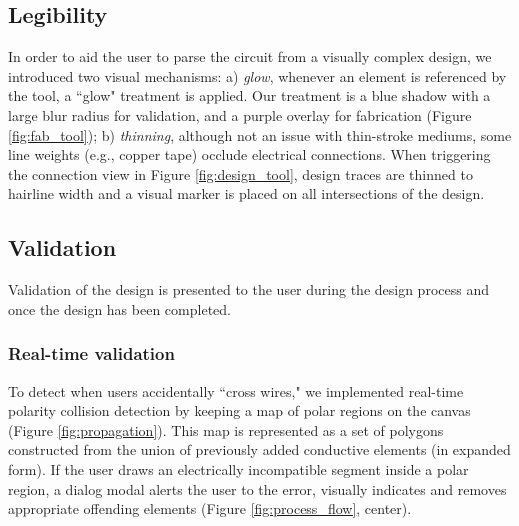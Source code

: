 \documentclass{sigchi}
\begin{document}
    \subsection{Legibility}
        In order to aid the user to parse the circuit from a visually complex design, we introduced two visual mechanisms: a) \textit{glow}, whenever an element is referenced by the tool, a ``glow" treatment is applied. Our treatment is a blue shadow with a large blur radius for validation, and a purple overlay for fabrication (Figure \ref{fig:fab_tool}); b) \textit{thinning}, although not an issue with thin-stroke mediums, some line weights (e.g., copper tape) occlude electrical connections. When triggering the connection view in Figure \ref{fig:design_tool}, design traces are thinned to hairline width and a visual marker is placed on all intersections of the design.
        
\subsection{Validation}
    Validation of the design is presented to the user during the design process and once the design has been completed. %
    \subsubsection{Real-time validation}
        To detect when users accidentally ``cross wires," we implemented real-time polarity collision detection by keeping a map of polar regions on the canvas (Figure \ref{fig:propagation}). This map is represented as a set of polygons constructed from the union of previously added conductive elements (in expanded form).
        If the user draws an electrically incompatible segment inside a polar region, a dialog modal alerts the user to the error, visually indicates and removes appropriate offending elements (Figure \ref{fig:process_flow}, center).
\end{document}
